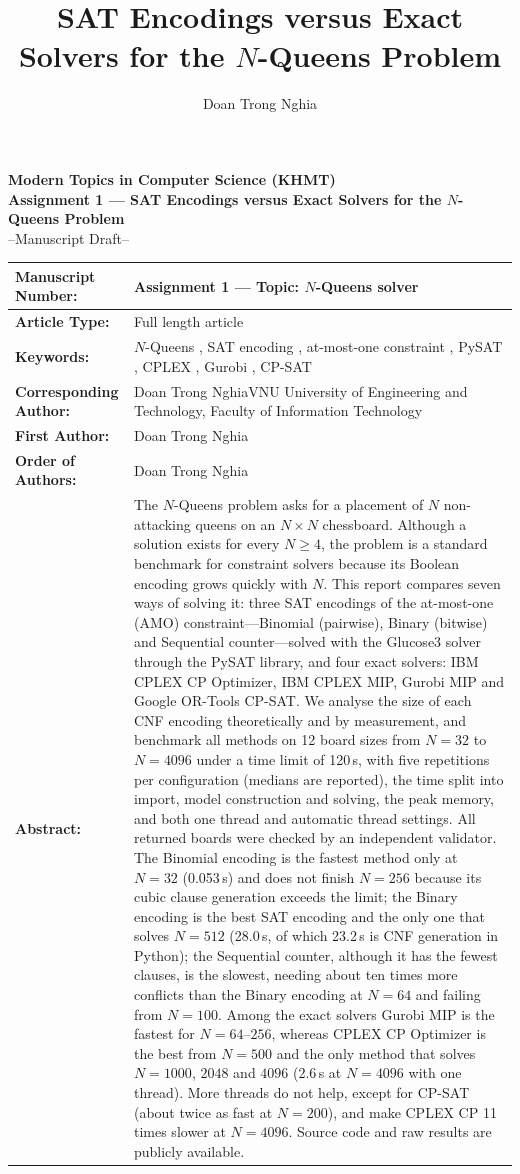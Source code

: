 \documentclass[a4paper,fleqn]{cas-sc}
\newcommand{\abstracttext}{%
The $N$-Queens problem asks for a placement of $N$ non-attacking queens on an $N\times N$ chessboard.
Although a solution exists for every $N\ge 4$, the problem is a standard benchmark for constraint solvers because its Boolean encoding grows quickly with $N$.
This report compares seven ways of solving it: three SAT encodings of the at-most-one (AMO) constraint---Binomial (pairwise), Binary (bitwise) and Sequential counter---solved with the Glucose3 solver through the PySAT library, and four exact solvers: IBM CPLEX CP Optimizer, IBM CPLEX MIP, Gurobi MIP and Google OR-Tools CP-SAT.
We analyse the size of each CNF encoding theoretically and by measurement, and benchmark all methods on 12 board sizes from $N=32$ to $N=4096$ under a time limit of 120\,s, with five repetitions per configuration (medians are reported), the time split into import, model construction and solving, the peak memory, and both one thread and automatic thread settings.
All returned boards were checked by an independent validator.
The Binomial encoding is the fastest method only at $N=32$ (0.053\,s) and does not finish $N=256$ because its cubic clause generation exceeds the limit;
the Binary encoding is the best SAT encoding and the only one that solves $N=512$ (28.0\,s, of which 23.2\,s is CNF generation in Python);
the Sequential counter, although it has the fewest clauses, is the slowest, needing about ten times more conflicts than the Binary encoding at $N=64$ and failing from $N=100$.
Among the exact solvers Gurobi MIP is the fastest for $N=64$--$256$, whereas CPLEX CP Optimizer is the best from $N=500$ and the only method that solves $N=1000$, $2048$ and $4096$ (2.6\,s at $N=4096$ with one thread).
More threads do not help, except for CP-SAT (about twice as fast at $N=200$), and make CPLEX CP 11 times slower at $N=4096$.
Source code and raw results are publicly available.
}
\newcommand{\keywordscover}{$N$-Queens , SAT encoding , at-most-one constraint , PySAT , CPLEX , Gurobi , CP-SAT}
\begin{document}
\thispagestyle{empty}
\begingroup
{}
\sffamily\color{covblue}
\begin{center}
{\Large\bfseries Modern Topics in Computer Science (KHMT)}\\[3pt]
{\large\bfseries Assignment 1 --- SAT Encodings versus Exact Solvers for the $N$-Queens Problem}\\[2pt]
{\normalsize --Manuscript Draft--}
\end{center}
\vspace{6pt}
\small
{}
\renewcommand{\arraystretch}{1.5}
\noindent\begin{tabularx}{\textwidth}{|>{\raggedright\bfseries}p{}|>{\raggedright\arraybackslash}X|}
\hline
\rowcolor{covgray} Manuscript Number: & Assignment 1 --- Topic: $N$-Queens solver\\\hline
Article Type: & Full length article\\\hline
\rowcolor{covgray} Keywords: & \keywordscover\\\hline
Corresponding Author: & Doan Trong Nghia\newline VNU University of Engineering and Technology, Faculty of Information Technology\\\hline
\rowcolor{covgray} First Author: & Doan Trong Nghia\\\hline
Order of Authors: & Doan Trong Nghia\\\hline
\rowcolor{covgray} Abstract: & \abstracttext\\\hline
\end{tabularx}
\endgroup
\clearpage
\setcounter{page}{1}

\let\WriteBookmarks\relax


\title [mode = title]{SAT Encodings versus Exact Solvers for the $N$-Queens Problem}

\author[1]{Doan Trong Nghia}
\cormark[1]


\end{document}
